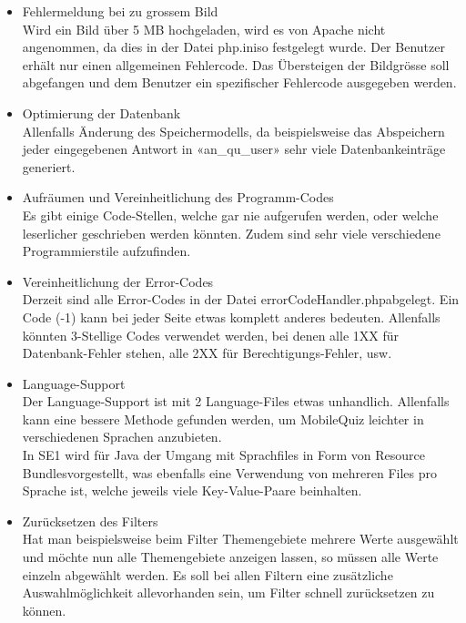 \begin{itemize}
	\item Fehlermeldung bei zu grossem Bild\\
	Wird ein Bild über 5 MB  hochgeladen, wird es von Apache nicht angenommen, da dies in der Datei \glqq php.ini\grqq so festgelegt wurde. Der Benutzer erhält nur einen allgemeinen Fehlercode. Das Übersteigen der Bildgrösse soll abgefangen und dem Benutzer ein spezifischer Fehlercode ausgegeben werden.

	\item Optimierung der Datenbank\\
	Allenfalls Änderung des Speichermodells, da beispielsweise das Abspeichern jeder eingegebenen Antwort in «an\_qu\_user» sehr viele Datenbankeinträge generiert.

	\item Aufräumen und Vereinheitlichung des Programm-Codes\\
	Es gibt einige Code-Stellen, welche gar nie aufgerufen werden, oder welche leserlicher geschrieben werden könnten. Zudem sind sehr viele verschiedene Programmierstile aufzufinden.

	\item Vereinheitlichung der Error-Codes\\
	Derzeit sind alle Error-Codes in der Datei \glqq errorCodeHandler.php\grqq abgelegt. Ein Code (-1) kann bei jeder Seite etwas komplett anderes bedeuten. Allenfalls könnten 3-Stellige Codes verwendet werden, bei denen alle 1XX für Datenbank-Fehler stehen, alle 2XX für Berechtigungs-Fehler, usw.

	\item Language-Support\\
	Der Language-Support ist mit 2 Language-Files etwas unhandlich. Allenfalls kann eine bessere Methode gefunden werden, um MobileQuiz leichter in verschiedenen Sprachen anzubieten.\\
	In \acrfull{SE1} wird für Java der Umgang mit Sprachfiles in Form von \glqq Resource Bundles\grqq vorgestellt, was ebenfalls eine Verwendung von mehreren Files pro Sprache ist, welche jeweils viele Key-Value-Paare beinhalten.
	
	\item Zurücksetzen des Filters\\
	Hat man beispielsweise beim Filter Themengebiete mehrere Werte ausgewählt und möchte nun alle Themengebiete anzeigen lassen, so müssen alle Werte einzeln abgewählt werden. Es soll bei allen Filtern eine zusätzliche Auswahlmöglichkeit \glqq alle\grqq vorhanden sein, um Filter schnell zurücksetzen zu können.
	

\end{itemize}
